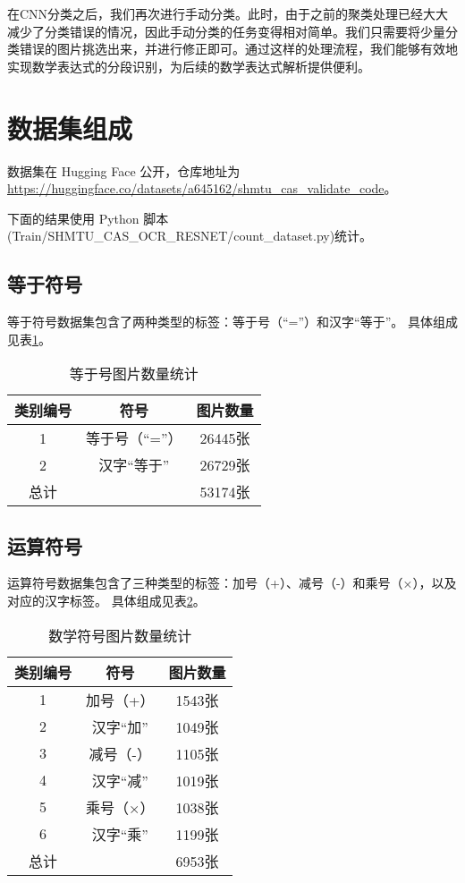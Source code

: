 在CNN分类之后，我们再次进行手动分类。此时，由于之前的聚类处理已经大大减少了分类错误的情况，因此手动分类的任务变得相对简单。我们只需要将少量分类错误的图片挑选出来，并进行修正即可。通过这样的处理流程，我们能够有效地实现数学表达式的分段识别，为后续的数学表达式解析提供便利。

\section{数据集组成}

数据集在 Hugging Face 公开，仓库地址为 \url{https://huggingface.co/datasets/a645162/shmtu_cas_validate_code}。

下面的结果使用 Python 脚本(Train/SHMTU\_CAS\_OCR\_RESNET/count\_dataset.py)统计。

\subsection{等于符号}

等于符号数据集包含了两种类型的标签：等于号（“=”）和汉字“等于”。
具体组成见表\ref{tab:pic_count_equal_symbol}。

\begin{table}[h]
	\centering
	\begin{tabular}{ccc}
		\toprule
		类别编号 & 符号 & 图片数量 \\
		\midrule
		1 & 等于号（“=”） & 26445张 \\
		2 & 汉字“等于” & 26729张 \\
		\midrule
		总计 & & 53174张 \\
		\bottomrule
	\end{tabular}
	\caption{等于号图片数量统计}
	\label{tab:pic_count_equal_symbol}
\end{table}

\subsection{运算符号}

运算符号数据集包含了三种类型的标签：加号（+）、减号（-）和乘号（×），以及对应的汉字标签。
具体组成见表\ref{tab:pic_count_math_symbols}。

\begin{table}[h]
	\centering
	\begin{tabular}{ccc}
		\toprule
		类别编号 & 符号 & 图片数量 \\
		\midrule
		1 & 加号（+） & 1543张 \\
		2 & 汉字“加” & 1049张 \\
		3 & 减号（-） & 1105张 \\
		4 & 汉字“减” & 1019张 \\
		5 & 乘号（×） & 1038张 \\
		6 & 汉字“乘” & 1199张 \\
		\midrule
		总计 & & 6953张 \\
		\bottomrule
	\end{tabular}
	\caption{数学符号图片数量统计}
	\label{tab:pic_count_math_symbols}
\end{table}

